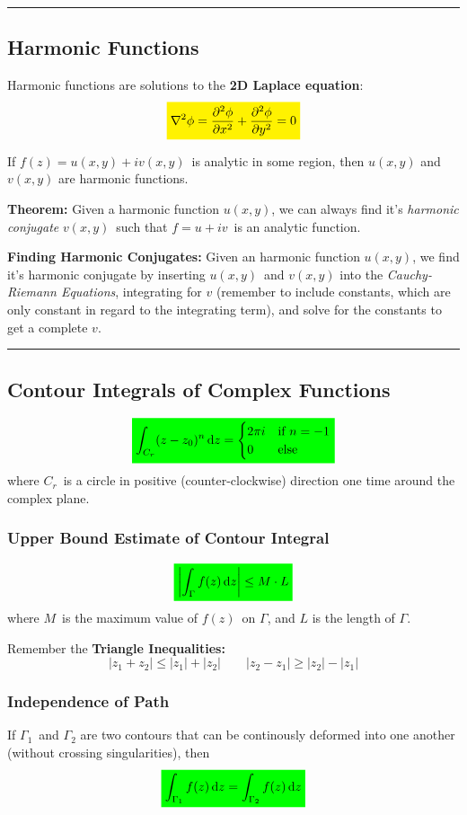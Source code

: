 \documentclass[10pt,a4paper]{article}
\newcommand{\holine}{\rule{286pt}{1pt}}
\newcommand{\yl}[1]{\colorbox{yellow}{$\displaystyle #1$}}
\newcommand{\gr}[1]{\colorbox{green}{$\displaystyle #1$}}
\begin{document}
\begin{multicols}{2}
\holine
\subsection*{Harmonic Functions}
Harmonic functions are solutions to the \textbf{2D Laplace equation}:
\[\yl{
    \nabla^2 \phi = \pdv[2]{\phi}{x} + \pdv[2]{\phi}{y} = 0
}\]

If $f(z) = u(x,y) + iv(x,y)$ is analytic in some region, then $u(x,y)$ and $v(x,y)$ are harmonic functions.

\textbf{Theorem:} Given a harmonic function $u(x,y)$, we can always find it's \textit{harmonic conjugate} $v(x,y)$ such that $f = u + iv$ is an analytic function.


\textbf{Finding Harmonic Conjugates:} Given an harmonic function $u(x,y)$, we find it's harmonic conjugate by inserting $u(x,y)$ and $v(x,y)$ into the \textit{Cauchy-Riemann Equations}, integrating for $v$ (remember to include constants, which are only constant in regard to the integrating term), and solve for the constants to get a complete $v$.


\holine
\subsection*{Contour Integrals of Complex Functions}
\[\gr{
    \int_{C_r} (z-z_0)^n \dd{z} = \begin{cases}
    2\pi i &\text{if} \ n=-1 \\
    0 &\text{else}
    \end{cases}
}\]
where $C_r$ is a circle in positive (counter-clockwise) direction one time around the complex plane.

\subsubsection*{Upper Bound Estimate of Contour Integral}
\[\gr{
    \qty|\int_\Gamma f(z) \dd{z}| \leq M\cdot L
}\]
where $M$ is the maximum value of $f(z)$ on $\Gamma$, and $L$ is the length of $\Gamma$.

Remember the \textbf{Triangle Inequalities:}
\[
    |z_1 + z_2| \leq |z_1| + |z_2| \quad\quad |z_2 - z_1| \geq |z_2| - |z_1|
\]


\subsubsection*{Independence of Path}
If $\Gamma_1$ and $\Gamma_2$ are two contours that can be continously deformed into one another (without crossing singularities), then
\[\gr{
    \int_{\Gamma_1} f(z) \dd{z} = \int_{\Gamma_2} f(z) \dd{z}
}\]


\end{multicols}
\end{document}
